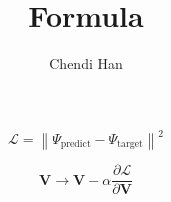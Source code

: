 \documentclass{article}
\title{Formula}
\author{Chendi Han }
\begin{document}
\maketitle

\begin{equation}
\mathcal{L}=\left\|\Psi_\text{predict}-\Psi_\text{target} \right\|^2
\end{equation}

\begin{equation}
\mathbf{V}\rightarrow\mathbf{V}-\alpha\frac{\partial \mathcal{L}}{\partial \mathbf{V}}
\end{equation}
\end{document}
